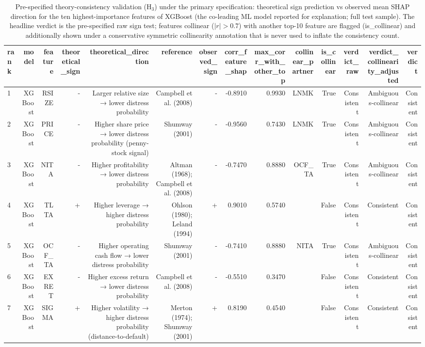 \begin{table}[htbp]
\centering
\caption{Pre-specified theory-consistency validation (H$_3$) under the primary specification: theoretical sign prediction vs observed mean SHAP direction for the ten highest-importance features of XGBoost (the co-leading ML model reported for explanation; full test sample). The headline verdict is the pre-specified raw sign test; features collinear ($|r|>0.7$) with another top-10 feature are flagged (is\_collinear) and additionally shown under a conservative symmetric collinearity annotation that is never used to inflate the consistency count.}
\label{tab:v2_theory_consistency}
\small
\begin{tabular}{lrrrrrrrrrrrrr}
\toprule
rank & model & feature & theoretical\_sign & theoretical\_direction & reference & observed\_sign & corr\_feature\_shap & max\_corr\_with\_other\_top & collinear\_partner & is\_collinear & verdict\_raw & verdict\_collinearity\_adjusted & verdict \\
\midrule
1 & XGBoost & RSIZE & - & Larger relative size → lower distress probability & Campbell et al. (2008) & - & -0.8910 & 0.9930 & LNMK & True & Consistent & Ambiguous-collinear & Consistent \\
2 & XGBoost & PRICE & - & Higher share price → lower distress probability (penny-stock signal) & Shumway (2001) & - & -0.9560 & 0.7430 & LNMK & True & Consistent & Ambiguous-collinear & Consistent \\
3 & XGBoost & NITA & - & Higher profitability → lower distress probability & Altman (1968); Campbell et al. (2008) & - & -0.7470 & 0.8880 & OCF\_TA & True & Consistent & Ambiguous-collinear & Consistent \\
4 & XGBoost & TLTA & + & Higher leverage → higher distress probability & Ohlson (1980); Leland (1994) & + & 0.9010 & 0.5740 &  & False & Consistent & Consistent & Consistent \\
5 & XGBoost & OCF\_TA & - & Higher operating cash flow → lower distress probability & Shumway (2001) & - & -0.7410 & 0.8880 & NITA & True & Consistent & Ambiguous-collinear & Consistent \\
6 & XGBoost & EXRET & - & Higher excess return → lower distress probability & Campbell et al. (2008) & - & -0.5510 & 0.3470 &  & False & Consistent & Consistent & Consistent \\
7 & XGBoost & SIGMA & + & Higher volatility → higher distress probability (distance-to-default) & Merton (1974); Shumway (2001) & + & 0.8190 & 0.4540 &  & False & Consistent & Consistent & Consistent \\

\end{tabular}
\end{table}
